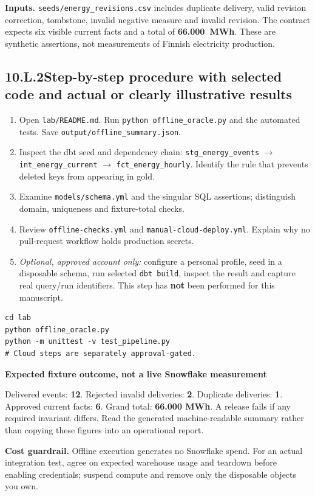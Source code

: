 \documentclass[11pt,twoside]{article}
\newcommand{\topic}[2]{\subsection*{#1\quad #2}}
\begin{document}
\textbf{Inputs.} \texttt{seeds/energy\_revisions.csv} includes duplicate delivery, valid revision correction, tombstone, invalid negative measure and invalid revision. The contract expects six visible current facts and a total of \textbf{66.000~MWh}. These are synthetic assertions, not measurements of Finnish electricity production.
\topic{10.L.2}{Step-by-step procedure with selected code and actual or clearly illustrative results}
\begin{enumerate}
\item Open \texttt{lab/README.md}. Run \texttt{python offline\_oracle.py} and the automated tests. Save \texttt{output/offline\_summary.json}.
\item Inspect the dbt seed and dependency chain: \texttt{stg\_energy\_events} $\to$\\ \texttt{int\_energy\_current} $\to$ \texttt{fct\_energy\_hourly}. Identify the rule that prevents deleted keys from appearing in gold.
\item Examine \texttt{models/schema.yml} and the singular SQL assertions; distinguish domain, uniqueness and fixture-total checks.
\item Review \texttt{offline-checks.yml} and \texttt{manual-cloud-deploy.yml}. Explain why no pull-request workflow holds production secrets.
\item \emph{Optional, approved account only:} configure a personal profile, seed in a disposable schema, run selected \texttt{dbt build}, inspect the result and capture real query/run identifiers. This step has \textbf{not} been performed for this manuscript.
\end{enumerate}
\begin{lstlisting}[caption={Safe zero-cloud commands.}]
cd lab
python offline_oracle.py
python -m unittest -v test_pipeline.py
# Cloud steps are separately approval-gated.
\end{lstlisting}
\begin{whitebox}\textbf{Expected fixture outcome, not a live Snowflake measurement}\par
Delivered events: \textbf{12}. Rejected invalid deliveries: \textbf{2}. Duplicate deliveries: \textbf{1}. Approved current facts: \textbf{6}. Grand total: \textbf{66.000 MWh}. A release fails if any required invariant differs. Read the generated machine-readable summary rather than copying these figures into an operational report.\end{whitebox}
\textbf{Cost guardrail.} Offline execution generates no Snowflake spend. For an actual integration test, agree on expected warehouse usage and teardown before enabling credentials; suspend compute and remove only the disposable objects you own.
\end{document}

